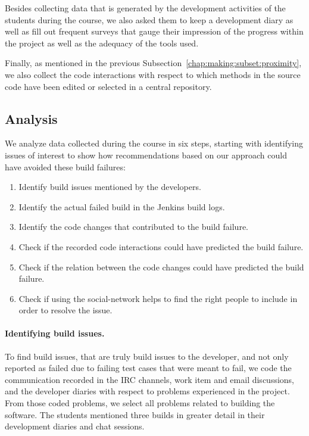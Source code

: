 Besides collecting data that is generated by the development activities of the students during the course, we also asked them to keep a development diary as well as fill out frequent surveys that gauge their impression of the progress within the project as well as the adequacy of the tools used.

Finally, as mentioned in the previous Subsection~\ref{chap:making:subset:proximity}, we also collect the code interactions with respect to which methods in the source code have been edited or selected in a central repository.

\subsection{Analysis}
\label{ch10:ana}
We analyze data collected during the course in six steps, starting with identifying issues of interest to show how recommendations based on our approach could have avoided these build failures:

\begin{enumerate}
\item Identify build issues mentioned by the developers.
\item Identify the actual failed build in the Jenkins build logs.
\item Identify the code changes that contributed to the build failure.
\item Check if the recorded code interactions could have predicted the build failure.
\item Check if the relation between the code changes could have predicted the build failure.
\item Check if using the social-network helps to find the right people to include in order to resolve the issue.
\end{enumerate}

\paragraph{Identifying build issues.}
To find build issues, that are truly build issues to the developer, and not only reported as failed due to failing test cases that were meant to fail, we code the communication recorded in the IRC channels, work item and email discussions, and the developer diaries with respect to problems experienced in the project.
From those coded problems, we select all problems related to building the software.
The students mentioned three builds in greater detail in their development diaries and chat sessions.

